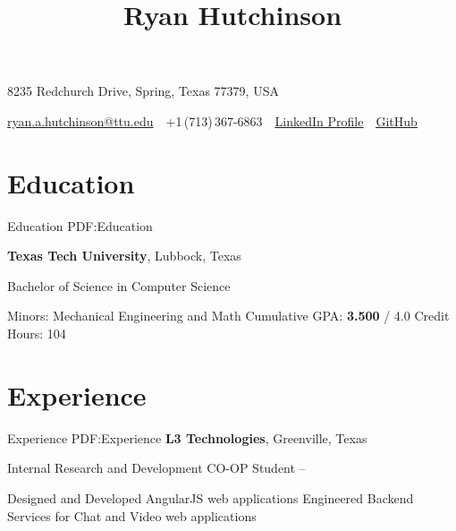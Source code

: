 \documentclass[a4paper,10pt,oneside]{article}
\begin{document}

\title{Ryan Hutchinson}

\begin{subtitle}

{8235 Redchurch Drive, Spring, Texas 77379, USA}
\par
\href{mailto:ryan.a.hutchinson@ttu.edu}
{ryan.a.hutchinson@ttu.edu}
\,\BulletSymbol\,
+1\,(713)\,367-6863
\,\BulletSymbol\,
\href{https://www.linkedin.com/in/ryan-hutchinson-94452a7b}{\underline{LinkedIn Profile}}
\,\BulletSymbol\,
\href{https://github.com/rahutchinson}{\underline{GitHub}}
\end{subtitle}

\begin{body}



\section
{Education}
{Education}
{PDF:Education}


{\textbf{Texas Tech University}},
Lubbock, Texas

\SmallEntryGap
Bachelor of Science in Computer Science
\hfill
\DatestampYMD{}{}{}
\textbf{}
\begin{detail}
\Item
Minors: Mechanical Engineering and Math
\Item
Cumulative GPA: \textbf{3.500} / 4.0
\Item
Credit Hours: 104
\end{detail}




\section
{Experience}
{Experience}
{PDF:Experience}
{\textbf{L3 Technologies}},
Greenville, Texas
\par
\Item
Internal Research and Development CO-OP Student
\hfill
{} --
\begin{detail}
\BulletItem
Designed and Developed AngularJS web applications
\BulletItem
Engineered Backend Services for Chat and Video web applications
\end{detail}
\SmallEntryGap
\SmallEntryGap


\end{body}
\end{document}
